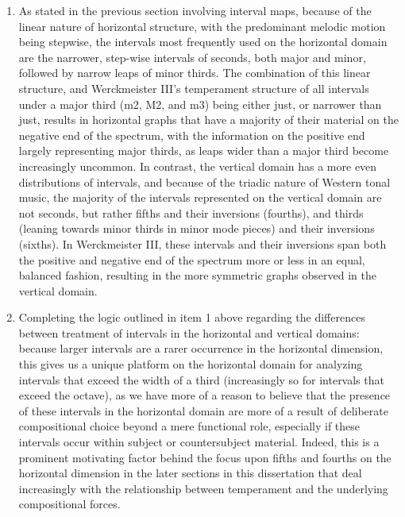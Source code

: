 \begin{enumerate}
\def\labelenumi{\arabic{enumi}.}
\tightlist
\item
  As stated in the previous section involving interval maps, because of
  the linear nature of horizontal structure, with the predominant
  melodic motion being stepwise, the intervals most frequently used on
  the horizontal domain are the narrower, step-wise intervals of
  seconds, both major and minor, followed by narrow leaps of minor
  thirds. The combination of this linear structure, and Werckmeister
  III's temperament structure of all intervals under a major third (m2,
  M2, and m3) being either just, or narrower than just, results in
  horizontal graphs that have a majority of their material on the
  negative end of the spectrum, with the information on the positive end
  largely representing major thirds, as leaps wider than a major third
  become increasingly uncommon. In contrast, the vertical domain has a
  more even distributions of intervals, and because of the triadic
  nature of Western tonal music, the majority of the intervals
  represented on the vertical domain are not seconds, but rather fifths
  and their inversions (fourths), and thirds (leaning towards minor
  thirds in minor mode pieces) and their inversions (sixths). In
  Werckmeister III, these intervals and their inversions span both the
  positive and negative end of the spectrum more or less in an equal,
  balanced fashion, resulting in the more symmetric graphs observed in
  the vertical domain.
\item
  Completing the logic outlined in item 1 above regarding the
  differences between treatment of intervals in the horizontal and
  vertical domains: because larger intervals are a rarer occurrence in
  the horizontal dimension, this gives us a unique platform on the
  horizontal domain for analyzing intervals that exceed the width of a
  third (increasingly so for intervals that exceed the octave), as we
  have more of a reason to believe that the presence of these intervals
  in the horizontal domain are more of a result of deliberate
  compositional choice beyond a mere functional role, especially if
  these intervals occur within subject or countersubject material.
  Indeed, this is a prominent motivating factor behind the focus upon
  fifths and fourths on the horizontal dimension in the later sections
  in this dissertation that deal increasingly with the relationship
  between temperament and the underlying compositional forces.
\end{enumerate}

